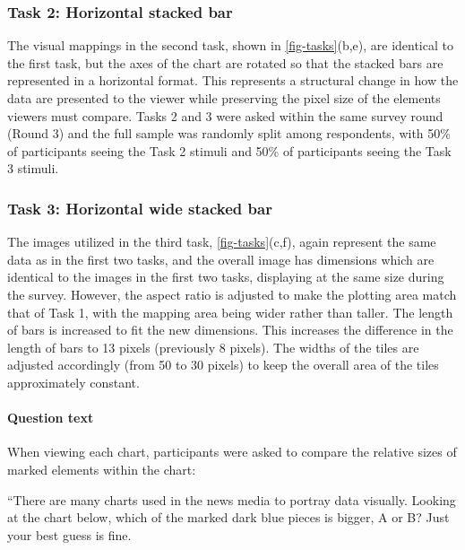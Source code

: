 \documentclass[
]{jds}
\let\oldparagraph\paragraph
\renewcommand{\paragraph}[1]{\oldparagraph{#1}\mbox{}}
\begin{document}
\hypertarget{task-2-horizontal-stacked-bar}{%
\subsubsection{Task 2: Horizontal stacked
bar}\label{task-2-horizontal-stacked-bar}}

The visual mappings in the second task, shown in
\autoref{fig-tasks}(b,e), are identical to the first task, but the axes
of the chart are rotated so that the stacked bars are represented in a
horizontal format. This represents a structural change in how the data
are presented to the viewer while preserving the pixel size of the
elements viewers must compare. Tasks 2 and 3 were asked within the same
survey round (Round 3) and the full sample was randomly split among
respondents, with 50\% of participants seeing the Task 2 stimuli and
50\% of participants seeing the Task 3 stimuli.

\hypertarget{task-3-horizontal-wide-stacked-bar}{%
\subsubsection{Task 3: Horizontal wide stacked
bar}\label{task-3-horizontal-wide-stacked-bar}}

The images utilized in the third task, \autoref{fig-tasks}(c,f), again
represent the same data as in the first two tasks, and the overall image
has dimensions which are identical to the images in the first two tasks,
displaying at the same size during the survey. However, the aspect ratio
is adjusted to make the plotting area match that of Task 1, with the
mapping area being wider rather than taller. The length of bars is
increased to fit the new dimensions. This increases the difference in
the length of bars to 13 pixels (previously 8 pixels). The widths of the
tiles are adjusted accordingly (from 50 to 30 pixels) to keep the
overall area of the tiles approximately constant.

\hypertarget{question-text}{%
\paragraph{Question text}\label{question-text}}

When viewing each chart, participants were asked to compare the relative
sizes of marked elements within the chart:

``There are many charts used in the news media to portray data visually.
Looking at the chart below, which of the marked dark blue pieces is
bigger, A or B? Just your best guess is fine.
\end{document}
